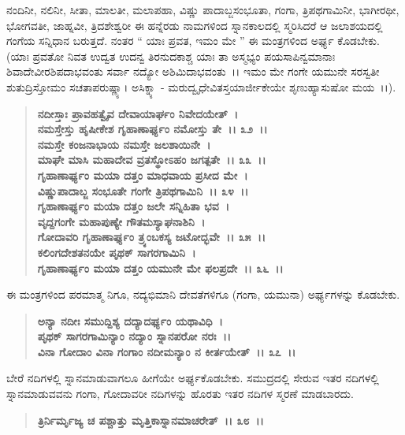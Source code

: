 ನಂದಿನೀ, ನಲಿನೀ, ಸೀತಾ, ಮಾಲತೀ, ಮಲಾಪಹಾ, ವಿಷ್ಣು ಪಾದಾಬ್ಜಸಂಭೂತಾ, ಗಂಗಾ, ತ್ರಿಪಥಗಾಮಿನೀ, ಭಾಗೀರಥೀ, ಭೋಗವತೀ, ಜಾಹ್ನವೀ, ತ್ರಿದಶೇಶ್ವರೀ\enginline{-} ಈ ಹನ್ನೆರಡು ನಾಮಗಳಿಂದ ಸ್ನಾನಕಾಲದಲ್ಲಿ ಸ್ಮರಿಸಿದರೆ ಆ ಜಲಾಶಯದಲ್ಲಿ ಗಂಗೆಯ ಸನ್ನಿಧಾನ ಬರುತ್ತದೆ. ನಂತರ “ ಯಾಃ ಪ್ರವತ, ಇಮಂ ಮೇ ” ಈ ಮಂತ್ರಗಳಿಂದ ಅರ್ಘ್ಯ ಕೊಡಬೇಕು. (ಯಾಃ ಪ್ರವತೋ ನಿವತ ಉದ್ವತ ಉದನ್ವ ತಿರನುದಕಾಶ್ಚ ಯಾಃ ತಾ ಅಸ್ಮಭ್ಯಂ ಪಯಸಾಪಿನ್ವಮಾನಾಃ ಶಿವಾದೇವೀರಶಿಪದಾಭವಂತು ಸರ್ವಾ ನದ್ಯೋ ಅಶಿಮಿದಾಭವಂತು~।। ಇಮಂ ಮೇ ಗಂಗೇ ಯಮುನೇ ಸರಸ್ವತೀ ಶುತುದ್ರಿಸ್ತೋಮಂ ಸಚತಾಪರುಷ್ಣ್ಯಾ। ಅಸಿಕ್ನ್ಯಾ - ಮರುದ್ವೃಧೇವಿತಸ್ತಯಾರ್ಜೀಕೇಯೇ ಶೃಣುಹ್ಯಾಸುಷೋ ಮಯ~।।).

\begin{verse}
\textbf{ನದೀಸ್ತಾಃ ಪ್ರಾವಹತ್ವೈವ ದೇವಾಯಾರ್ಘಂ ನಿವೇದಯೇತ್~।}\\\textbf{ನಮಸ್ತೇಸ್ತು ಹೃಷೀಕೇಶ ಗೃಹಾಣಾರ್ಘ್ಯಂ ನಮೋಸ್ತು ತೇ~।। ೩೨~।।}\\\textbf{ನಮಸ್ತೇ ಕಂಜನಾಭಾಯ ನಮಸ್ತೇ ಜಲಶಾಯಿನೇ~।}\\\textbf{ಮಾಘೇ ಮಾಸಿ ಮಹಾದೇವ ವ್ರತಸ್ಥೋಽಹಂ ಜಗತ್ಪತೇ~।। ೩೩~।।}\\\textbf{ಗೃಹಾಣಾರ್ಘ್ಯಂ ಮಯಾ ದತ್ತಂ ಮಾಧವಾಯ ಪ್ರಸೀದ ಮೇ~।}\\\textbf{ವಿಷ್ಣುಪಾದಾಬ್ಜ ಸಂಭೂತೇ ಗಂಗೇ ತ್ರಿಪಥಗಾಮಿನಿ~।। ೩೪~।।}\\\textbf{ಗೃಹಾಣಾರ್ಘ್ಯಂ ಮಯಾ ದತ್ತಂ ಜಲೇ ಸನ್ನಿಹಿತಾ ಭವ~।}\\\textbf{ವೃದ್ದಗಂಗೇ ಮಹಾಪುಣ್ಯೇ ಗೌತಮಸ್ಯಾಘನಾಶಿನಿ~।}\\\textbf{ಗೋದಾವರಿ ಗೃಹಾಣಾರ್ಘ್ಯಂ ತ್ರ್ಯಂಬಕಸ್ಯ ಜಟೋದ್ಭವೇ~।। ೩೫~।।}\\\textbf{ಕಲಿಂಗದೇಶತನಯೇ ಪೃಥಕ್ ಸಾಗರಗಾಮಿನಿ~।}\\\textbf{ಗೃಹಾಣಾರ್ಘ್ಯಂ ಮಯಾ ದತ್ತಂ ಯಮುನೇ ಮೇ ಫಲಪ್ರದೇ~।। ೩೬~।।}
\end{verse}

ಈ ಮಂತ್ರಗಳಿಂದ ಪರಮಾತ್ಮ ನಿಗೂ, ನದ್ಯಭಿಮಾನಿ ದೇವತೆಗಳಿಗೂ (ಗಂಗಾ, ಯಮುನಾ) ಅರ್ಘ್ಯಗಳನ್ನು ಕೊಡಬೇಕು.

\begin{verse}
\textbf{ಅನ್ಯಾ ನದೀಃ ಸಮುದ್ದಿಶ್ಯ ದದ್ಯಾದರ್ಘ್ಯಂ ಯಥಾವಿಧಿ~।}\\\textbf{ಪೃಥಕ್ ಸಾಗರಗಾಮಿನ್ಯಾಂ ನದ್ಯಾಂ ಸ್ನಾನಪರೋ ನರಃ~।।}\\\textbf{ವಿನಾ ಗೋದಾಂ ವಿನಾ ಗಂಗಾಂ ನದೀಮನ್ಯಾಂ ನ ಕೀರ್ತಯೇತ್~।। ೩೭~।।}
\end{verse}

ಬೇರೆ ನದಿಗಳಲ್ಲಿ ಸ್ನಾನಮಾಡುವಾಗಲೂ ಹೀಗೆಯೇ ಅರ್ಘ್ಯಕೊಡಬೇಕು. ಸಮುದ್ರದಲ್ಲಿ ಸೇರುವ ಇತರ ನದಿಗಳಲ್ಲಿ ಸ್ನಾನಮಾಡುವವನು ಗಂಗಾ, ಗೋದಾವರೀ ನದಿಗಳನ್ನು ಹೊರತು ಇತರ ನದಿಗಳ ಸ್ಮರಣೆ ಮಾಡಬಾರದು.

\begin{verse}
\textbf{ತ್ರಿರ್ನಿರ್ಮೃಜ್ಯ ಚ ಪಶ್ಚಾತ್ತು ಮೃತ್ತಿಕಾಸ್ನಾನಮಾಚರೇತ್~।। ೩೮~।।} 
\end{verse}

